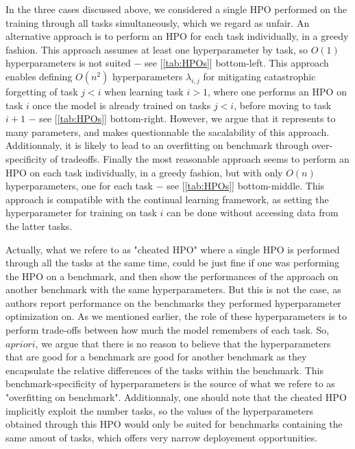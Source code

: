\documentclass[11pt]{article}
\begin{document}
\vspace{1mm}
\noindent
In the three cases discussed above, we considered a single HPO performed on the training through all tasks simultaneously, which we regard as unfair. An alternative approach is to perform an HPO for each task individually, in a greedy fashion. This approach assumes at least one hyperparameter by task, so $O(1)$ hyperparameters is not suited $-$ see [\ref{tab:HPOs}] bottom-left. This approach enables defining $O(n^2)$ hyperparameters $\lambda_{i,j}$ for mitigating catastrophic forgetting of task $j<i$ when learning task $i>1$, where one performs an HPO on task $i$ once the model is already trained on tasks $j<i$, before moving to task $i+1$ $-$ see [\ref{tab:HPOs}] bottom-right. However, we argue that it represents to many parameters, and makes questionnable the sacalability of this approach. Additionnaly, it is likely to lead to an overfitting on benchmark through over-specificity of tradeoffs. Finally the most reasonable approach seems to perform an HPO on each task individually, in a greedy fashion, but with only $O(n)$ hyperparameters, one for each task $-$ see [\ref{tab:HPOs}] bottom-middle. This approach is compatible with the continual learning framework, as setting the hyperparameter for training on task $i$ can be done without accessing data from the latter tasks.

\vspace{1mm}
\noindent
Actually, what we refere to as "cheated HPO" where a single HPO is performed through all the tasks at the same time, could be just fine if one was performing the HPO on a benchmark, and then show the performances of the approach on another benchmark with the same hyperparameters. But this is not the case, as authors report performance on the benchmarks they performed hyperparameter optimization on. As we mentioned earlier, the role of these hyperparameters is to perform trade-offs between how much the model remembers of each task. So, $a priori$, we argue that there is no reason to believe that the hyperparameters that are good for a benchmark are good for another benchmark as they encapsulate the relative differences of the tasks within the benchmark. This benchmark-specificity of hyperparameters is the source of what we refere to as "overfitting on benchmark". Additionnaly, one should note that the cheated HPO implicitly exploit the number tasks, so the values of the hyperparameters obtained through this HPO would only be suited for benchmarks containing the same amout of tasks, which offers very narrow deployement opportunities. 
\end{document}
